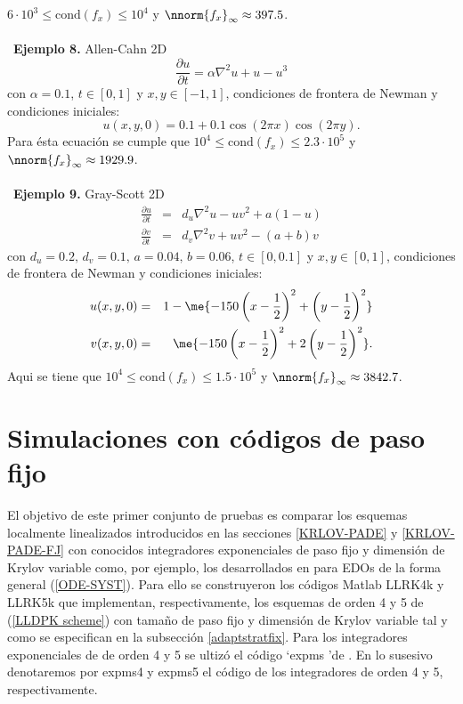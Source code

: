 $6\cdot 10^3\leq \mathrm{cond}(f_x)\leq 10^4$ y $\nnorm{f_x}_\infty\approx 397\mathord{.}5$.\\ \\
\
\textbf{Ejemplo 8.} Allen-Cahn 2D~\cite{allenchan2d,loffeld2013comparative}
\[ \frac{\partial u}{\partial t} = \alpha\nabla^{2} u + u - u^{3}  \]
con $\alpha=0\mathord{.}1$, $t\in[0, 1]$ y $x,y\in[-1,1]$, condiciones de frontera de Newman y condiciones iniciales:
\[ u(x,y,0)=0\mathord{.}1+0\mathord{.}1\cos(2\pi x)\cos(2\pi y). \]
Para ésta ecuación se cumple que 
$10^4 \leq \mathrm{cond}(f_x)\leq 2\mathord{.}3\cdot10^5$ y $\nnorm{f_x}_\infty\approx 1929\mathord{.}9$.\\ \\
\
\textbf{Ejemplo 9.} Gray-Scott 2D~\cite{grayscott2d,loffeld2013comparative}
\begin{eqnarray*}
	\frac{\partial u}{\partial t} &=& d_u\nabla^{2}u -uv^{2}+a(1-u) \\
	\frac{\partial v}{\partial t} &=& d_v\nabla^{2}v +uv^{2}-(a+b)v
\end{eqnarray*}
con $d_u=0\mathord{.}2,\,d_v=0\mathord{.}1,\,a=0\mathord{.}04,\,b=0\mathord{.}06$, $t\in[0, 0\mathord{.}1]$ y $x,y\in[0,1]$, condiciones de frontera de Newman y condiciones iniciales:
\begin{eqnarray*}
	u(x,y,0) & = & 1-\me{-150\left(x-\frac{1}{2}\right)^{2}+\left(y-\frac{1}{2}\right)^{2}}\\
	v(x,y,0) & = & \me{-150\left(x-\frac{1}{2}\right)^{2}+2\left(y-\frac{1}{2}\right)^{2}}.
\end{eqnarray*}
Aqui se tiene que $10^4\leq \mathrm{cond}(f_x)\leq 1\mathord{.}5\cdot 10^5$ y $\nnorm{f_x}_\infty\approx 3842\mathord{.}7$.

\section{Simulaciones con códigos de paso fijo}\label{Seccion simulacion paso fijo}
El objetivo de este primer conjunto de pruebas es comparar los esquemas localmente linealizados introducidos en las secciones \ref{KRLOV-PADE} y  \ref{KRLOV-PADE-FJ} con conocidos integradores exponenciales de paso fijo y dimensión de Krylov variable como, por ejemplo, los desarrollados en \cite{adams} para EDOs de la forma general (\ref{ODE-SYST}). Para ello se construyeron los c\'odigos Matlab LLRK4k y LLRK5k que implementan, respectivamente, los esquemas de orden 4 y 5 de  (\ref{LLDPK scheme}) con tama\~no de paso fijo y dimensión de Krylov variable tal y como se especifican en la subsección \ref{adaptstratfix}. Para los integradores exponenciales de \cite{adams} de orden 4 y 5 se ultizó el código \textquoteleft expms \textquoteright de \cite{expode}. En lo susesivo denotaremos por expms4 y expms5 el código de los integradores de orden 4 y 5, respectivamente.  

